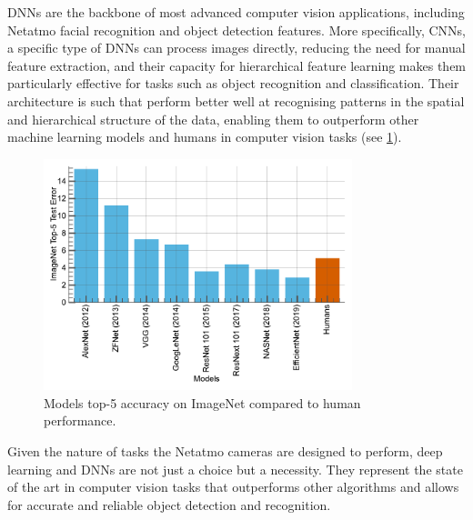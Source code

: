 \acp{DNN} are the backbone of most advanced computer vision applications,
including Netatmo facial recognition and object detection features. More
specifically, \acp{CNN}, a specific type of \acp{DNN} can process images
directly, reducing the need for manual feature extraction, and their capacity
for hierarchical feature learning makes them particularly effective for tasks
such as object recognition and classification. Their architecture is such that
perform better well at recognising patterns in the spatial and hierarchical
structure of the data, enabling them to outperform other machine learning models
and humans in computer vision tasks (see \cref{fig:intro:models_vs_humans}).\\

\begin{figure}[htbp]
    \centering
    \includegraphics[width=0.8\textwidth]{chapter_intro/assets/models_vs_human.pdf}
    \caption{Models top-5 accuracy on ImageNet \cite{deng2009imagenet} compared
    to human performance.}
    \label{fig:intro:models_vs_humans}
\end{figure}


Given the nature of tasks the Netatmo cameras are designed to perform, deep
learning and \aclp{DNN} are not just a choice but a necessity. They represent
the state of the art in computer vision tasks that outperforms other algorithms
and allows for accurate and reliable object detection and recognition.\\



